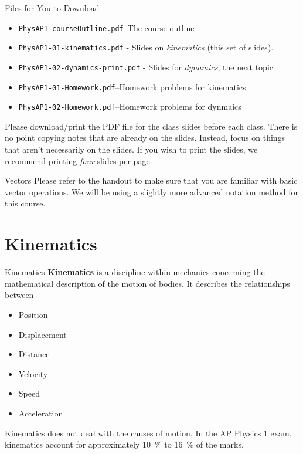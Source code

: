 \documentclass[12pt,compress,aspectratio=169]{beamer}
\begin{document}
\begin{frame}
  \titlepage
\end{frame}



\begin{frame}{Files for You to Download}
  \begin{itemize}
  \item\texttt{PhysAP1-courseOutline.pdf}--The course outline
  \item\texttt{PhysAP1-01-kinematics.pdf} - Slides on \emph{kinematics} (this set of slides).
  \item\texttt{PhysAP1-02-dynamics-print.pdf} - Slides for \emph{dynamics}, the next topic
  \item\texttt{PhysAP1-01-Homework.pdf}--Homework problems for kinematics
  \item\texttt{PhysAP1-02-Homework.pdf}--Homework problems for dynmaics
  \end{itemize}
  
  \vspace{.1in}Please download/print the PDF file for the class slides before
  each class. There is no point copying notes that are already on the slides.
  Instead, focus on things that aren't necessarily on the slides. If you wish
  to print the slides, we recommend printing \emph{four} slides per page.
\end{frame}



\begin{frame}{Vectors}
  Please refer to the handout to make sure that you are familiar with basic
  vector operations. We will be using a slightly more advanced notation method
  for this course.
\end{frame}



\section{Kinematics}

\begin{frame}{Kinematics}
  \textbf{Kinematics} is a discipline within mechanics concerning the
  mathematical description of the motion of bodies. It describes the
  relationships between 
  \begin{itemize}
  \item<alert@1> Position
  \item<alert@1> Displacement
  \item Distance 
  \item<alert@1> Velocity
  \item Speed
  \item<alert@1> Acceleration
  \end{itemize}
  Kinematics does not deal with the causes of motion. In the AP Physics 1 exam,
  kinematics account for approximately \SI{10}{\percent} to \SI{16}{\percent} of
  the marks.
\end{frame}
\end{document}
